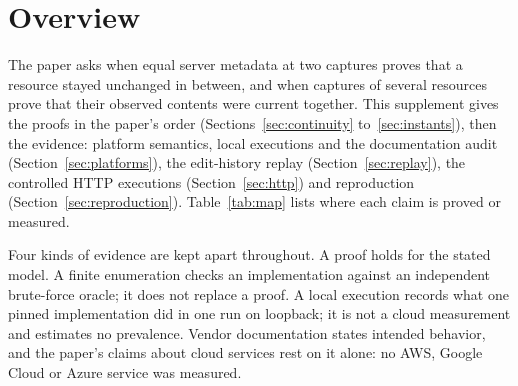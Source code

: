 \section{Overview}\label{sec:map}
The paper asks when equal server metadata at two captures proves that a
resource stayed unchanged in between, and when captures of several resources
prove that their observed contents were current together. This supplement
gives the proofs in the paper's order (Sections~\ref{sec:continuity}
to~\ref{sec:instants}), then the evidence: platform semantics, local
executions and the documentation audit (Section~\ref{sec:platforms}), the
edit-history replay (Section~\ref{sec:replay}), the controlled HTTP executions
(Section~\ref{sec:http}) and reproduction (Section~\ref{sec:reproduction}).
Table~\ref{tab:map} lists where each claim is proved or measured.

Four kinds of evidence are kept apart throughout. A proof holds for the
stated model. A finite enumeration checks an implementation against an
independent brute-force oracle; it does not replace a proof. A local execution
records what one pinned implementation did in one run on loopback; it is not
a cloud measurement and estimates no prevalence. Vendor documentation states
intended behavior, and the paper's claims about cloud services rest on it
alone: no AWS, Google Cloud or Azure service was measured.

